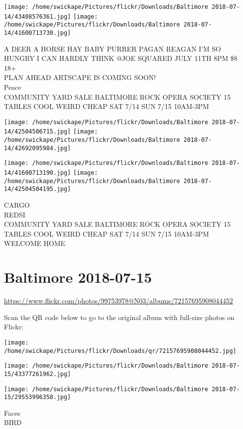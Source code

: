 \documentclass[10pt,letterpaper]{article}
\begin{document}
\texttt{[image: /home/swickape/Pictures/flickr/Downloads/Baltimore 2018-07-14/43408576361.jpg]}
\texttt{[image: /home/swickape/Pictures/flickr/Downloads/Baltimore 2018-07-14/41600713730.jpg]}

A DEER A HORSE HAY BABY PURRER PAGAN REAGAN I'M SO HUNGRY I CAN HARDLY THINK @JOE SQUARED JULY 11TH 8PM \$8 18+\\
PLAN AHEAD ARTSCAPE IS COMING SOON!\\
Peace\\
COMMUNITY YARD SALE BALTIMORE ROCK OPERA SOCIETY 15 TABLES COOL WEIRD CHEAP SAT 7/14 SUN 7/15 10AM{-}3PM
\pagebreak

\texttt{[image: /home/swickape/Pictures/flickr/Downloads/Baltimore 2018-07-14/42504506715.jpg]}
\texttt{[image: /home/swickape/Pictures/flickr/Downloads/Baltimore 2018-07-14/42692095984.jpg]}

\texttt{[image: /home/swickape/Pictures/flickr/Downloads/Baltimore 2018-07-14/41600713190.jpg]}
\texttt{[image: /home/swickape/Pictures/flickr/Downloads/Baltimore 2018-07-14/42504504195.jpg]}

CARGO\\
REDSI\\
COMMUNITY YARD SALE BALTIMORE ROCK OPERA SOCIETY 15 TABLES COOL WEIRD CHEAP SAT 7/14 SUN 7/15 10AM{-}3PM\\
WELCOME HOME
\pagebreak

\section*{Baltimore 2018-07-15}

\url{https://www.flickr.com/photos/99753978@N03/albums/72157695908044452}

Scan the QR code below to go to the original album with full-size photos on Flickr:

\texttt{[image: /home/swickape/Pictures/flickr/Downloads/qr/72157695908044452.jpg]}
\pagebreak

\texttt{[image: /home/swickape/Pictures/flickr/Downloads/Baltimore 2018-07-15/43377261962.jpg]}

\vspace{0.25in}
\texttt{[image: /home/swickape/Pictures/flickr/Downloads/Baltimore 2018-07-15/29553996358.jpg]}

Faces\\
BIRD
\pagebreak
\end{document}
